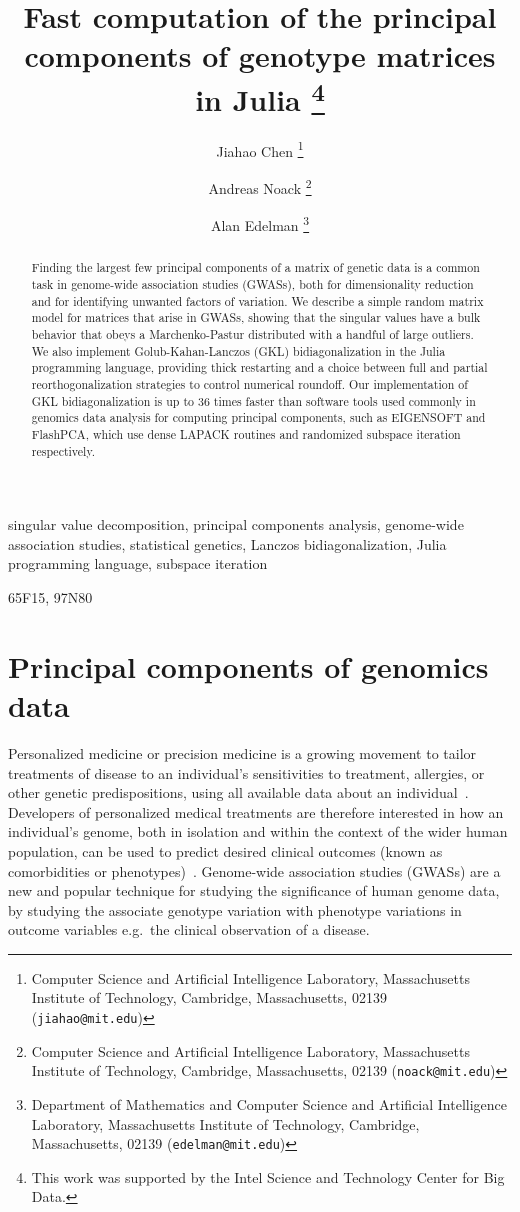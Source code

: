 \documentclass[review]{siamart0516}
\title{Fast computation of the principal components of genotype matrices in Julia
    \thanks{This
        work was supported by the Intel Science and Technology Center for Big Data.
	}}
\author{%
    Jiahao Chen
    \thanks{Computer Science and Artificial Intelligence Laboratory,
           Massachusetts Institute of Technology,
           Cambridge, Massachusetts, 02139 ({\tt jiahao@mit.edu})}
    \and
    Andreas Noack
    \thanks{Computer Science and Artificial Intelligence Laboratory,
            Massachusetts Institute of Technology,
            Cambridge, Massachusetts, 02139 ({\tt noack@mit.edu})}
    \and
    Alan Edelman
    \thanks{Department of Mathematics and Computer Science and Artificial Intelligence Laboratory,
            Massachusetts Institute of Technology,
            Cambridge, Massachusetts, 02139 ({\tt edelman@mit.edu})}
}
\begin{document}
\maketitle

\tableofcontents

\begin{abstract}
Finding the largest few principal components of a matrix of genetic data
is a common task in genome-wide association studies (GWASs), both for
dimensionality reduction and for identifying unwanted factors of
variation.  We describe a simple random matrix model for matrices that
arise in GWASs, showing that the singular values have a bulk behavior that
obeys a Marchenko-Pastur distributed with a handful of large outliers.
We also implement Golub-Kahan-Lanczos (GKL) bidiagonalization in the Julia
programming language, providing thick restarting and a choice between full
and partial reorthogonalization strategies to control numerical roundoff.
Our implementation of GKL bidiagonalization is up to 36 times faster than
software tools used commonly in genomics data analysis for computing principal
components, such as EIGENSOFT and FlashPCA, which use dense LAPACK routines
and randomized subspace iteration respectively.
\end{abstract}

\begin{keywords}
    singular value decomposition,
    principal components analysis,
    genome-wide association studies,
    statistical genetics,
    Lanczos bidiagonalization,
    Julia programming language,
    subspace iteration
\end{keywords}

\begin{AMS}
    65F15, 97N80
\end{AMS}

\pagestyle{myheadings}
\thispagestyle{plain}

\section{Principal components of genomics data}

Personalized medicine or precision medicine is a growing movement to tailor treatments of disease
to an individual's sensitivities to treatment, allergies, or other genetic
predispositions, using all available data about an individual~\cite{Desmond2012}.
Developers of personalized medical treatments are therefore interested in how an
individual's genome, both in isolation and within the context of the wider human
population, can be used to predict desired clinical outcomes (known as
comorbidities or phenotypes)~\cite[Ch. 8]{Laird2011}.
Genome-wide association studies (GWASs) are a new and popular technique for
studying the significance of human genome data, by studying the associate genotype
variation with phenotype variations in outcome variables e.g.\ the clinical
observation of a disease.
\end{document}
